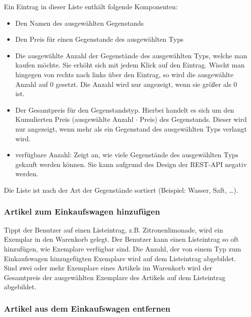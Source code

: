 Ein Eintrag in dieser Liste enthält folgende Komponenten:

\begin{itemize}
	\item Den Namen des ausgewählten Gegenstands

	\item Den Preis für einen Gegenstande des ausgewählten Typs

	\item Die ausgewählte Anzahl der Gegenstände des ausgewählten Typs, welche man kaufen möchte.
	Sie erhöht sich mit jedem Klick auf den Eintrag.
	Wischt man hingegen von rechts nach links über den Eintrag, so wird die ausgewählte Anzahl auf 0 gesetzt.
	Die Anzahl wird nur angezeigt, wenn sie größer als 0 ist.

	\item Der Gesamtpreis für den Gegenstandstyp.
	Hierbei handelt es sich um den Kumulierten Preis (ausgewählte Anzahl $\cdot$ Preis) des Gegenstands.
	Dieser wird nur angezeigt, wenn mehr als ein Gegenstand des ausgewählten Typs verlangt wird.

	\item verfügbare Anzahl: Zeigt an, wie viele Gegenstände des ausgewählten Typs gekauft werden können.
	Sie kann aufgrund des Design der REST-API negativ werden.
\end{itemize}

Die Liste ist nach der Art der Gegenstände sortiert (Beispiel: Wasser, Saft, \ldots).

\subsubsection{Artikel zum Einkaufswagen hinzufügen} \label{subsubsec:shoppingcart-add-item}

Tippt der Benutzer auf einen Listeintrag, z.B. Zitronenlimonade, wird ein Exemplar in den Warenkorb gelegt.
Der Benutzer kann einen Listeintrag so oft hinzufügen, wie Exemplare verfügbar sind.
Die Anzahl, der von einem Typ zum Einkaufswagen hinzugefügten Exemplare wird auf dem Listeintrag abgebildet.
Sind zwei oder mehr Exemplare eines Artikels im Warenkorb wird der Gesamtpreis der ausgewählten Exemplare des Artikels auf dem Listeintrag abgebildet.

\subsubsection{Artikel aus dem Einkaufswagen entfernen} \label{subsubsec:shoppingcart-del-item}

